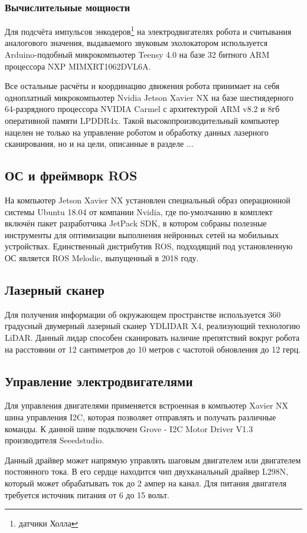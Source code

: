 \documentclass[12pt,a4paper]{scrartcl}
\begin{document}
				\subsubsection{Вычислительные мощности}
					Для подсчёта импульсов энкодеров\footnote{датчики Холла} на электродвигателях робота и считывания аналогового значения, выдаваемого звуковым эхолокатором используется Arduino-подобный микрокомпьютер Teensy 4.0 на базе 32 битного ARM процессора NXP MIMXRT1062DVL6A\cite{bib:TeensyDesc}. 
					
					Все остальные расчёты и координацию движения робота принимает на себя одноплатный микрокомпьютер Nvidia Jetson Xavier NX на базе шестиядерного 64-разрядного процессора NVIDIA Carmel с архитектурой ARM v8.2 и 8гб оперативной памяти LPDDR4x\cite{bib:XavierNXDesc}. Такой высокопроизводительный компьютер нацелен не только на управление роботом и обработку данных лазерного сканирования, но и на цели, описанные в разделе ...
			\subsection{ОС и фреймворк ROS}
				На компьютер Jetson Xavier NX установлен специальный образ операционной системы Ubuntu 18.04 от компании Nvidia, где по-умолчанию в комплект включён пакет разработчика JetPack SDK, в котором собраны полезные инструменты для оптимизации выполнения нейронных сетей на мобильных устройствах. Единственный дистрибутив ROS, подходящий под установленную ОС является ROS Melodic, выпущенный в 2018 году.
			\subsection{Лазерный сканер}
				Для получения информации об окружающем пространстве используется 360 градусный двумерный лазерный сканер YDLIDAR X4, реализующий технологию LiDAR. Данный лидар способен сканировать наличие препятствий вокруг робота на расстоянии от 12 сантиметров до 10 метров с частотой обновления до 12 герц\cite{bib:YDLidarX4Desc}.
			\subsection{Управление электродвигателями}
				Для управления двигателями применяется встроенная в компьютер Xavier NX шина управления I2C, которая позволяет отправлять и получать различные команды. К данной шине подключен Grove - I2C Motor Driver V1.3 производителя Seeedstudio. 
				
				Данный драйвер может напрямую управлять шаговым двигателем или двигателем постоянного тока. В его сердце находится чип двухканальный драйвер L298N, который может обрабатывать ток до 2 ампер на канал. Для питания двигателя требуется источник питания от 6 до 15 вольт. 
				
\end{document}
